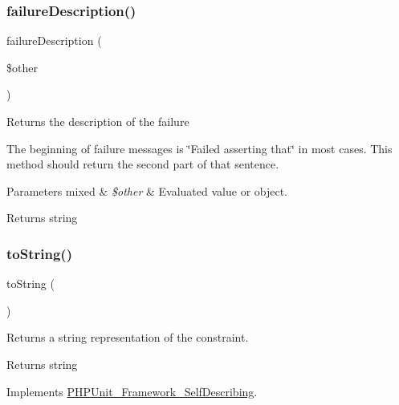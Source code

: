 \subsubsection{\texorpdfstring{failure\+Description()}{failureDescription()}}
{\footnotesize\ttfamily failure\+Description (\begin{DoxyParamCaption}\item[{}]{\$other }\end{DoxyParamCaption})\hspace{0.3cm}{\ttfamily [protected]}}

Returns the description of the failure

The beginning of failure messages is \char`\"{}\+Failed asserting that\char`\"{} in most cases. This method should return the second part of that sentence.


\begin{DoxyParams}[1]{Parameters}
mixed & {\em \$other} & Evaluated value or object.\\
\hline
\end{DoxyParams}
\begin{DoxyReturn}{Returns}
string 
\end{DoxyReturn}
\mbox{\label{class_p_h_p_unit___framework___constraint___attribute_a5558c5d549f41597377fa1ea8a1cefa3}} 
\subsubsection{\texorpdfstring{to\+String()}{toString()}}
{\footnotesize\ttfamily to\+String (\begin{DoxyParamCaption}{ }\end{DoxyParamCaption})}

Returns a string representation of the constraint.

\begin{DoxyReturn}{Returns}
string 
\end{DoxyReturn}


Implements \mbox{\hyperlink{interface_p_h_p_unit___framework___self_describing_a5558c5d549f41597377fa1ea8a1cefa3}{P\+H\+P\+Unit\+\_\+\+Framework\+\_\+\+Self\+Describing}}.



